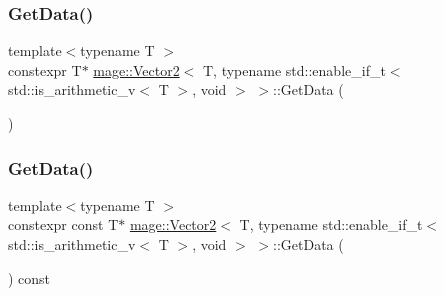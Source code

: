 \subsubsection{\texorpdfstring{Get\+Data()}{GetData()}\hspace{0.1cm}{\footnotesize\ttfamily [1/2]}}
{\footnotesize\ttfamily template$<$typename T $>$ \\
constexpr T$\ast$ \hyperlink{structmage_1_1_vector2}{mage\+::\+Vector2}$<$ T, typename std\+::enable\+\_\+if\+\_\+t$<$ std\+::is\+\_\+arithmetic\+\_\+v$<$ T $>$, void $>$ $>$\+::Get\+Data (\begin{DoxyParamCaption}{ }\end{DoxyParamCaption})\hspace{0.3cm}{\ttfamily [noexcept]}}

\hypertarget{structmage_1_1_vector2_3_01_t_00_01typename_01std_1_1enable__if__t_3_01std_1_1is__arithmetic__v_3_01_t_01_4_00_01void_01_4_01_4_ad6e08e161a4665e596c1bad2005bbc58}{}\label{structmage_1_1_vector2_3_01_t_00_01typename_01std_1_1enable__if__t_3_01std_1_1is__arithmetic__v_3_01_t_01_4_00_01void_01_4_01_4_ad6e08e161a4665e596c1bad2005bbc58} 
\subsubsection{\texorpdfstring{Get\+Data()}{GetData()}\hspace{0.1cm}{\footnotesize\ttfamily [2/2]}}
{\footnotesize\ttfamily template$<$typename T $>$ \\
constexpr const T$\ast$ \hyperlink{structmage_1_1_vector2}{mage\+::\+Vector2}$<$ T, typename std\+::enable\+\_\+if\+\_\+t$<$ std\+::is\+\_\+arithmetic\+\_\+v$<$ T $>$, void $>$ $>$\+::Get\+Data (\begin{DoxyParamCaption}{ }\end{DoxyParamCaption}) const\hspace{0.3cm}{\ttfamily [noexcept]}}

